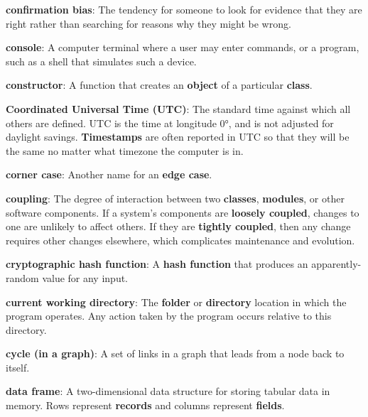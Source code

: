 \documentclass[krantzl]{krantz}
\newcommand{\glosskey}[1]{\textbf{#1}}
\begin{document}
\noindent \textbf{{\newline}\glosskey{confirmation bias}}: 
The tendency for someone to look for evidence that they are right rather than searching for reasons why they might be wrong.


\noindent \textbf{{\newline}\glosskey{console}}: 
A computer terminal where a user may enter commands, or a program, such as a shell that simulates such a device.


\noindent \textbf{{\newline}\glosskey{constructor}}: 
A function that creates an \glosskey{object} of a particular \glosskey{class}.


\noindent \textbf{{\newline}\glosskey{Coordinated Universal Time} (UTC)}: 
The standard time against which all others are defined. UTC is the time at longitude 0°, and is not adjusted for daylight savings. \glosskey{Timestamps} are often reported in UTC so that they will be the same no matter what timezone the computer is in.


\noindent \textbf{{\newline}\glosskey{corner case}}: 
Another name for an \glosskey{edge case}.


\noindent \textbf{{\newline}\glosskey{coupling}}: 
The degree of interaction between two \glosskey{classes}, \glosskey{modules}, or other software components. If a system’s components are \glosskey{loosely coupled}, changes to one are unlikely to affect others.  If they are \glosskey{tightly coupled}, then any change requires other changes elsewhere, which complicates maintenance and evolution.


\noindent \textbf{{\newline}\glosskey{cryptographic hash function}}: 
A \glosskey{hash function} that produces an apparently-random value for any input.


\noindent \textbf{{\newline}\glosskey{current working directory}}: 
The \glosskey{folder} or \glosskey{directory} location in which the program operates. Any action taken by the program occurs relative to this directory.


\noindent \textbf{{\newline}\glosskey{cycle (in a graph)}}: 
A set of links in a graph that leads from a node back to itself.


\noindent \textbf{{\newline}\glosskey{data frame}}: 
A two-dimensional data structure for storing tabular data in memory. Rows represent \glosskey{records} and columns represent \glosskey{fields}.
\end{document}
